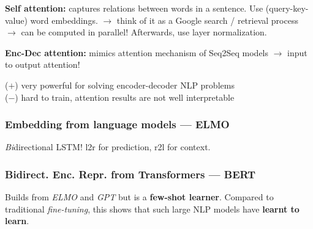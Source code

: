 \textbf{Self attention:}\enskip
captures relations between words in a sentence. Use (query-key-value) word embeddings.
$\to$ think of it as a Google search / retrieval process\enskip
$\to$ can be computed in parallel!\enskip
Afterwards, use layer normalization.

\textbf{Enc-Dec attention:}\enskip
mimics attention mechanism of Seq2Seq models $\to$ input to output attention!\enskip

($+$) very powerful for solving encoder-decoder NLP problems\\
($-$) hard to train, attention results are not well interpretable


\subsubsection{Embedding from language models --- ELMO}

\textit{Bi}directional LSTM!\enskip
l2r for prediction,\enskip
r2l for context.


\subsubsection{Bidirect. Enc. Repr. from Transformers --- BERT}

Builds from \textit{ELMO} and \textit{GPT} but is a \textbf{few-shot learner}.
Compared to traditional \textit{fine-tuning}, this shows that such large NLP models have \textbf{learnt to learn}.
